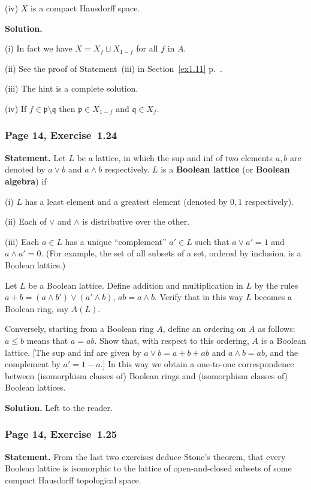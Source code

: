 \documentclass[12pt,letterpaper]{article}%
\newcommand{\mf}{\mathfrak}
\newcommand{\ppp}{\mf p}
\newcommand{\qqq}{\mf q}
\newcommand{\nn}{\noindent}
\begin{document}
\nn(iv) $X$ is a compact Hausdorff space.

\nn\textbf{Solution.} 

\nn(i) In fact we have $X=X_f\sqcup X_{1-f}$ for all $f$ in $A$.

\nn(ii) See the proof of Statement~(iii) in Section~\ref{ex1.11} p.~\pageref{ex1.11}.

\nn(iii) The hint is a complete solution.

\nn(iv) If $f\in\ppp\setminus\qqq$ then $\ppp\in X_{1-f}$ and $\qqq\in X_f$.

\subsubsection{Page 14, Exercise~1.24}%

\textbf{Statement.} Let $L$ be a lattice, in which the sup and inf of two elements $a,b$ are denoted by $a\lor b$ and $a\land b$ respectively. $L$ is a \textbf{Boolean lattice} (or \textbf{Boolean algebra}) if

\nn(i) $L$ has a least element and a greatest element (denoted by $0,1$ respectively). 

\nn(ii) Each of $\lor$ and $\land$ is distributive over the other.

\nn(iii) Each $a\in L$ has a unique ``complement'' $a'\in L$ such that $a\vee a'=1$ and $a\land a'=0$. (For example, the set of all subsets of a set, ordered by inclusion, is a Boolean lattice.)

Let $L$ be a Boolean lattice. Define addition and multiplication in $L$ by the rules $a+b=(a\land b')\lor (a'\land b)$, $ab=a\land b$. Verify that in this way $L$ becomes a Boolean ring, say $A(L)$.

Conversely, starting from a Boolean ring $A$, define an ordering on $A$ as follows: $a\le b$ means that $a=ab$. Show that, with respect to this ordering, $A$ is a Boolean lattice. [The sup and inf are given by $a\lor b=a+b+ab$ and $a\land b=ab$, and the complement by $a'=1-a$.] In this way we obtain a one-to-one correspondence between (isomorphism classes of) Boolean rings and (isomorphism classes of) Boolean lattices.

\nn\textbf{Solution.} Left to the reader.%

\subsubsection{Page 14, Exercise~1.25}%

\textbf{Statement.} From the last two exercises deduce Stone's theorem, that every Boolean lattice is isomorphic to the lattice of open-and-closed subsets of some compact Hausdorff topological space.
\end{document}
